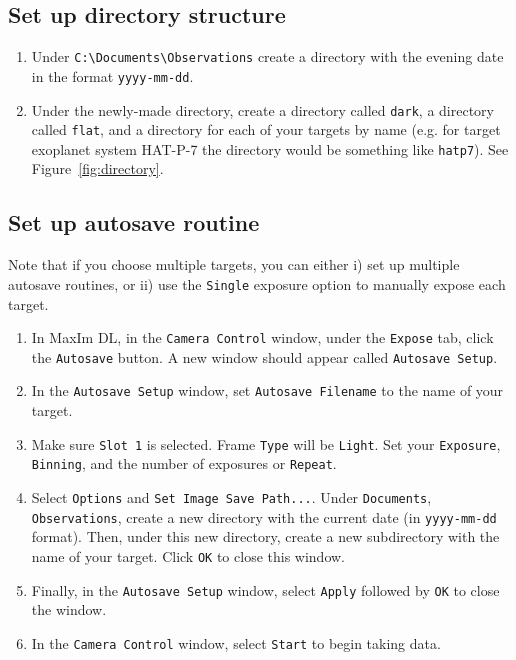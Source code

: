\documentclass{article}
\begin{document}
	\subsection{Set up directory structure}
	\label{sec:set-up-directory-structure}
	
	\begin{enumerate}
		
		\item Under \texttt{C:\textbackslash Documents\textbackslash Observations} create a directory with the evening date in the format \texttt{yyyy-mm-dd}.
		
		\item Under the newly-made directory, create a directory called \texttt{dark}, a directory called \texttt{flat}, and a directory for each of your targets by name (e.g. for target exoplanet system HAT-P-7 the directory would be something like \texttt{hatp7}). See Figure~\ref{fig:directory}.
		
	\end{enumerate}
	
	\subsection{Set up autosave routine}
	\label{sec:set-up-autosave-routine}
	
	Note that if you choose multiple targets, you can either i) set up multiple autosave routines, or ii) use the \texttt{Single} exposure option to manually expose each target.
	
	\begin{enumerate}
		
		\item In MaxIm DL, in the \texttt{Camera Control} window, under the \texttt{Expose} tab, click the \texttt{Autosave} button. A new window should appear called \texttt{Autosave Setup}.
		
		\item In the \texttt{Autosave Setup} window, set \texttt{Autosave Filename} to the name of your target.
		
		\item Make sure \texttt{Slot 1} is selected. Frame \texttt{Type} will be \texttt{Light}. Set your \texttt{Exposure}, \texttt{Binning}, and the number of exposures or \texttt{Repeat}.
		
		\item Select \texttt{Options} and \texttt{Set Image Save Path...}. Under \texttt{Documents}, \texttt{Observations}, create a new directory with the current date (in \texttt{yyyy-mm-dd} format). Then, under this new directory, create a new subdirectory with the name of your target. Click \texttt{OK} to close this window.
		
		\item Finally, in the \texttt{Autosave Setup} window, select \texttt{Apply} followed by \texttt{OK} to close the window.
		
		\item In the \texttt{Camera Control} window, select \texttt{Start} to begin taking data.
		
	\end{enumerate}
	
\end{document}
